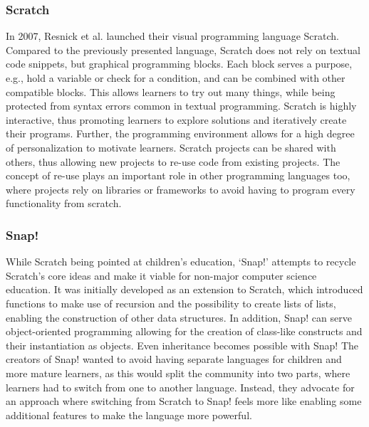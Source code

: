 \subsubsection{Scratch}
In 2007, Resnick et al. launched their visual programming language Scratch\cite{resnick_scratch_2009}.
Compared to the previously presented language, Scratch does not rely on textual code snippets, but graphical programming blocks.
Each block serves a purpose, e.g., hold a variable or check for a condition, and can be combined with other compatible blocks.
This allows learners to try out many things, while being protected from syntax errors common in textual programming.
Scratch is highly interactive, thus promoting learners to explore solutions and iteratively create their programs.
Further, the programming environment allows for a high degree of personalization to motivate learners.
Scratch projects can be shared with others, thus allowing new projects to re-use code from existing projects.
The concept of re-use plays an important role in other programming languages too, where projects rely on libraries or frameworks to avoid having to program every functionality from scratch.

\subsubsection{Snap!}
While Scratch being pointed at children's education, `Snap!' attempts to recycle Scratch’s core ideas and make it viable for non-major computer science education\cite{harvey_bringing_2010}.
It was initially developed as an extension to Scratch, which introduced functions to make use of recursion and the possibility to create lists of lists, enabling the construction of other data structures.
In addition, Snap! can serve object-oriented programming allowing for the creation of class-like constructs and their instantiation as objects.
Even inheritance becomes possible with Snap! The creators of Snap! wanted to avoid having separate languages for children and more mature learners, as this would split the community into two parts, where learners had to switch from one to another language.
Instead, they advocate for an approach where switching from Scratch to Snap! feels more like enabling some additional features to make the language more powerful.

